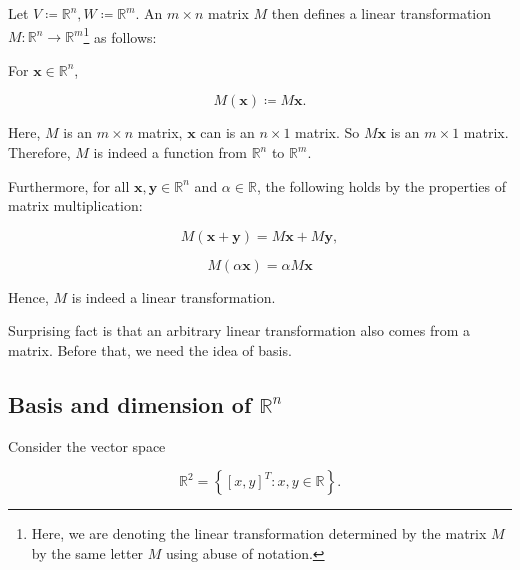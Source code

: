 \begin{example}
	Let \( V \coloneq \mathbb{R}^n, W \coloneq \mathbb{R}^m \). An \( m \times n \) matrix \( M \) then defines a linear transformation \( M : \mathbb{R}^n \to \mathbb{R}^m\)\footnote{Here, we are denoting the linear transformation determined by the matrix \( M \) by the same letter \( M \) using abuse of notation.} as follows:

	For \( \mathbf{x} \in \mathbb{R}^n \),

	\begin{equation}
		M(\mathbf{x}) \coloneq M \mathbf{x}.
		\label{eq:linear-transformations-1}
	\end{equation}

	Here, \( M \) is an \( m \times n \) matrix, \( \mathbf{x} \) can is an \( n \times 1 \) matrix. So \( M \mathbf{x} \) is an \( m \times 1 \) matrix. Therefore, \( M \) is indeed a function from \( \mathbb{R}^n \) to \( \mathbb{R}^m \).

	Furthermore, for all \( \mathbf{x}, \mathbf{y} \in \mathbb{R}^n \) and \( \alpha \in \mathbb{R} \), the following holds by the properties of matrix multiplication:

	\begin{equation}
		M(\mathbf{x} + \mathbf{y}) = M \mathbf{x} + M \mathbf{y},
		\label{eq:linear-transformations-2}
	\end{equation}

	\begin{equation}
		M(\alpha \mathbf{x}) = \alpha M \mathbf{x}
		\label{eq:linear-transformations-3}
	\end{equation}

	Hence, \( M \) is indeed a linear transformation.

\end{example}

Surprising fact is that an arbitrary linear transformation also comes from a matrix. Before that, we need the idea of basis.

\subsection[Basis and dimension of Rn]{Basis and dimension of \(\mathbb{R}^n\)}

Consider the vector space

\begin{equation}
	\mathbb{R}^2= \left\{[x, y]^T:x,y\in\mathbb{R}\right\}.
	\label{eq:basis-and-dimension-of-r-1}
\end{equation}

